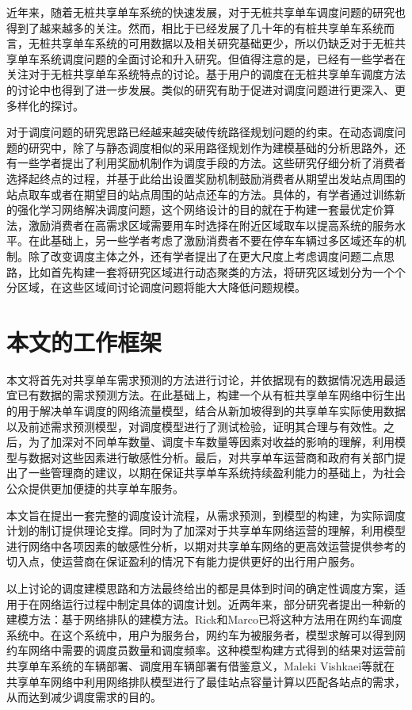 \documentclass[]{tongjithesis}
\numberwithin{equation}{chapter}
\begin{document}
近年来，随着无桩共享单车系统的快速发展，对于无桩共享单车调度问题的研究也得到了越来越多的关注。然而，相比于已经发展了几十年的有桩共享单车系统而言，无桩共享单车系统的可用数据以及相关研究基础更少，所以仍缺乏对于无桩共享单车系统调度问题的全面讨论和升入研究。但值得注意的是，已经有一些学者在关注对于无桩共享单车系统特点的讨论\cite{shen2018understanding,li2019operating,xing2020exploring}。基于用户的调度在无桩共享单车调度方法的讨论中也得到了进一步发展。类似的研究有助于促进对调度问题进行更深入、更多样化的探讨。

对于调度问题的研究思路已经越来越突破传统路径规划问题的约束。在动态调度问题的研究中，除了与静态调度相似的采用路径规划作为建模基础的分析思路外，还有一些学者提出了利用奖励机制作为调度手段的方法\cite{fricker2016incentives,ghosh2017incentivizing}。这些研究仔细分析了消费者选择起终点的过程，并基于此给出设置奖励机制鼓励消费者从期望出发站点周围的站点取车或者在期望目的站点周围的站点还车的方法。具体的，有学者通过训练新的强化学习网络解决调度问题，这个网络设计的目的就在于构建一套最优定价算法，激励消费者在高需求区域需要用车时选择在附近区域取车以提高系统的服务水平\cite{pan2019deep}。在此基础上，另一些学者考虑了激励消费者不要在停车车辆过多区域还车的机制\cite{duan2019optimizing,ji2020does}。除了改变调度主体之外，还有学者提出了在更大尺度上考虑调度问题二点思路，比如首先构建一套将研究区域进行动态聚类的方法，将研究区域划分为一个个分区域，在这些区域间讨论调度问题将能大大降低问题规模\cite{caggiani2017dynamic}。

\section{本文的工作框架}
本文将首先对共享单车需求预测的方法进行讨论，并依据现有的数据情况选用最适宜已有数据的需求预测方法。在此基础上，构建一个从有桩共享单车网络中衍生出的用于解决单车调度的网络流量模型，结合从新加坡得到的共享单车实际使用数据以及前述需求预测模型，对调度模型进行了测试检验，证明其合理与有效性。之后，为了加深对不同单车数量、调度卡车数量等因素对收益的影响的理解，利用模型与数据对这些因素进行敏感性分析。最后，对共享单车运营商和政府有关部门提出了一些管理商的建议，以期在保证共享单车系统持续盈利能力的基础上，为社会公众提供更加便捷的共享单车服务。

本文旨在提出一套完整的调度设计流程，从需求预测，到模型的构建，为实际调度计划的制订提供理论支撑。同时为了加深对于共享单车网络运营的理解，利用模型进行网络中各项因素的敏感性分析，以期对共享单车网络的更高效运营提供参考的切入点，使运营商在保证盈利的情况下有能力提供更好的出行用户服务。

以上讨论的调度建模思路和方法最终给出的都是具体到时间的确定性调度方案，适用于在网络运行过程中制定具体的调度计划。近两年来，部分研究者提出一种新的建模方法：基于网络排队的建模方法。Rick和Marco已将这种方法用在网约车调度系统中\cite{zhang2015queueing}。在这个系统中，用户为服务台，网约车为被服务者，模型求解可以得到网约车网络中需要的调度员数量和调度频率。这种模型构建方式得到的结果对运营前共享单车系统的车辆部署、调度用车辆部署有借鉴意义，Maleki Vishkaei等就在共享单车网络中利用网络排队模型进行了最佳站点容量计算以匹配各站点的需求，从而达到减少调度需求的目的\cite{vishkaei2020balancing}。
\end{document}
